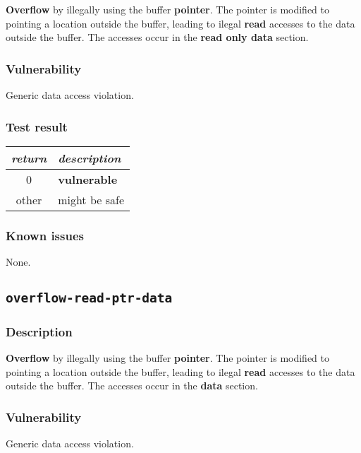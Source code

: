 \documentclass[a4paper]{book}
\begin{document}
\textbf{Overflow} by illegally using the buffer \textbf{pointer}.
The pointer is modified to pointing a location outside the buffer,
leading to ilegal \textbf{read} accesses to the data outside the buffer.
The accesses occur in the \textbf{read only data} section.

\subsubsection{Vulnerability}
Generic data access violation.

\subsubsection{Test result}

\begin{tabular}{cl}
  \toprule
  \emph{return}  & \emph{description} \\
  \midrule
  0              & \textbf{vulnerable} \\
  other          & might be safe \\
  \bottomrule
\end{tabular}

\subsubsection{Known issues}

None.

\newpage

\subsection{\texttt{overflow-read-ptr-data}}\label{test-overflow-read-ptr-data}

\subsubsection{Description}

\textbf{Overflow} by illegally using the buffer \textbf{pointer}.
The pointer is modified to pointing a location outside the buffer,
leading to ilegal \textbf{read} accesses to the data outside the buffer.
The accesses occur in the \textbf{data} section.

\subsubsection{Vulnerability}
Generic data access violation.
\end{document}
